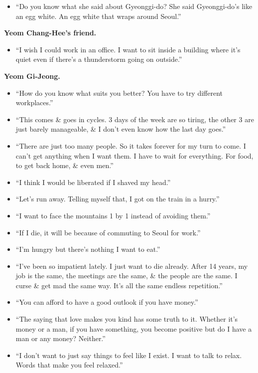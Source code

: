\documentclass{article}
\begin{document}
\begin{enumerate}
\begin{itemize}
		``I got off at the wrong stop.'' -- Mr. Gu
		\item ``Do you know what she said about Gyeonggi-do? She said Gyeonggi-do's like an egg white. An egg white that wraps around Seoul.''
	\end{itemize}
	{\bf Yeom Chang-Hee's friend.}
	\begin{itemize}
		\item ``I wish I could work in an office. I want to sit inside a building where it's quiet even if there's a thunderstorm going on outside.''
	\end{itemize}
	{\bf Yeom Gi-Jeong.}
	\begin{itemize}
		\item ``How do you know what suits you better? You have to try different workplaces.''
		\item ``This comes \& goes in cycles. 3 days of the week are so tiring, the other 3 are just barely manageable, \& I don't even know how the last day goes.''
		\item ``There are just too many people. So it takes forever for my turn to come. I can't get anything when I want them. I have to wait for everything. For food, to get back home, \& even men.''
		\item ``I think I would be liberated if I shaved my head.''
		\item ``Let's run away. Telling myself that, I got on the train in a hurry.''
		\item ``I want to face the mountains 1 by 1 instead of avoiding them.''
		\item ``If I die, it will be because of commuting to Seoul for work.''
		\item ``I'm hungry but there's nothing I want to eat.''
		\item ``I've been so impatient lately. I just want to die already. After 14 years, my job is the same, the meetings are the same, \& the people are the same. I curse \& get mad the same way. It's all the same endless repetition.''
		\item ``You can afford to have a good outlook if you have money.''
		\item ``The saying that love makes you kind has some truth to it. Whether it's money or a man, if you have something, you become positive but do I have a man or any money? Neither.''
		\item ``I don't want to just say things to feel like I exist. I want to talk to relax. Words that make you feel relaxed.''
	\end{itemize}

\end{enumerate}
\end{document}
